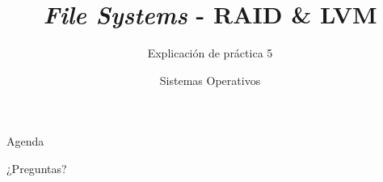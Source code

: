 




\title{\textit{File Systems} - RAID \& LVM}
\author{Sistemas Operativos}
\subtitle{Explicación de práctica 5}



\begin{frame}
  \titlepage
\end{frame}

\begin{frame}{Agenda}
  \tableofcontents
\end{frame}



\begin{frame}{}
  \begin{center}
    \vfill
    \huge ¿Preguntas?
    \vfill
  \end{center}
\end{frame}


